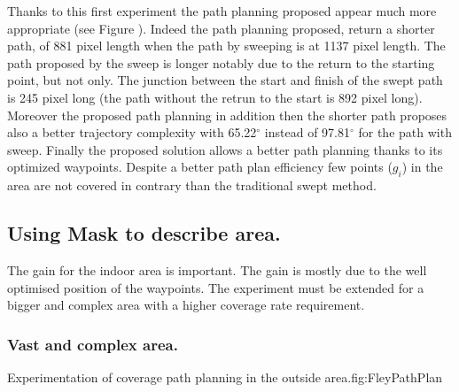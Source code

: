 Thanks to this first experiment the path planning proposed appear much more appropriate (see Figure ). Indeed the path planning proposed, return a shorter path, of 881 pixel length when  the path by sweeping is at 1137 pixel length. The path proposed by the sweep is longer notably due to the return to the starting point, but not only. The junction between the start and finish of the swept path is 245 pixel long (the path without the retrun to the start is 892  pixel long).%
 Moreover the proposed path planning in addition then the shorter path proposes also a better trajectory complexity  with 65.22$^\circ$ instead of 97.81$^\circ$ for the path with sweep.
Finally the proposed solution allows a better path planning thanks to its optimized waypoints. Despite a better path plan efficiency few points ($g_i$) in the area are not covered in contrary than the traditional swept method.



\subsection{Using Mask to describe area.}\label{coverageOutDoor}

The gain for the indoor area is important. The gain is mostly due to the well optimised position of the waypoints. The experiment must be extended for a bigger and complex area with a higher coverage rate requirement.


\subsubsection{Vast and complex area.} \label{fey_map_CPPP}
 
 \begin{mfigures}[!]{Experimentation of coverage path planning in the outside area.}{fig:FleyPathPlan} \centering
\hspace{1cm}

\tabsimuposeFleyPath
\end{mfigures} 
 
